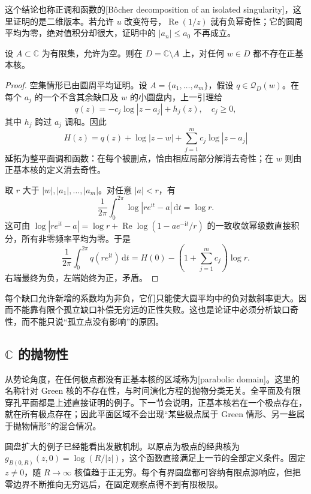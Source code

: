 这个结论也称正调和函数的[Bôcher decomposition of an isolated singularity]，这里证明的是二维版本。若允许 \(u\) 改变符号，\(\operatorname{Re}(1/z)\) 就有负幂奇性；它的圆周平均为零，绝对值积分却很大，证明中的 \(|a_n|\le a_0\) 不再成立。

\begin{proposition}\label{b3:prop:17-finite-punctures-parabolic}
设 \(A\subset\mathbb C\) 为有限集，允许为空。则在 \(D=\mathbb C\setminus A\) 上，对任何 \(w\in D\) 都不存在正基本核。
\end{proposition}
\begin{proof}
空集情形已由圆周平均证明。设 \(A=\{a_1,\ldots,a_m\}\)，假设 \(q\in\mathcal Q_D(w)\)。在每个 \(a_j\) 的一个不含其余缺口及 \(w\) 的小圆盘内，上一引理给
\[
 q(z)=-c_j\log|z-a_j|+h_j(z),\quad c_j\ge0,
\]
其中 \(h_j\) 跨过 \(a_j\) 调和。因此
\[
 H(z)=q(z)+\log|z-w|+\sum_{j=1}^m c_j\log|z-a_j|
\]
延拓为整平面调和函数：在每个被删点，恰由相应局部分解消去奇性；在 \(w\) 则由正基本核的定义消去奇性。

取 \(r\) 大于 \(|w|,|a_1|,\ldots,|a_m|\)。对任意 \(|a|<r\)，有
\[
 \frac1{2\pi}\int_0^{2\pi}\log|re^{\mathrm it}-a|\,\mathrm dt=\log r.
\]
这可由 \(\log|re^{\mathrm it}-a|=\log r+\operatorname{Re}\log(1-ae^{-\mathrm it}/r)\) 的一致收敛幂级数直接积分，所有非零频率平均为零。于是
\[
 \frac1{2\pi}\int_0^{2\pi}q(re^{\mathrm it})\,\mathrm dt
 =H(0)-\left(1+\sum_{j=1}^m c_j\right)\log r.
\]
右端最终为负，左端始终为正，矛盾。
\end{proof}

每个缺口允许新增的系数均为非负，它们只能使大圆平均中的负对数斜率更大。因而不能靠有限个孤立缺口补偿无穷远的正性失败。这也是论证中必须分析缺口奇性，而不能只说“孤立点没有影响”的原因。

\subsection{\texorpdfstring{\(\mathbb C\)}{C} 的抛物性}
\label{b3:subsec:170203}

从势论角度，在任何极点都没有正基本核的区域称为[parabolic domain]。这里的名称针对 Green 核的不存在性，与时间演化方程的抛物分类无关。全平面及有限穿孔平面都是上述直接证明的例子。下一节会说明，正基本核若在一个极点存在，就在所有极点存在；因此平面区域不会出现“某些极点属于 Green 情形、另一些属于抛物情形”的混合情况。

\ProseParagraphBreak
圆盘扩大的例子已经能看出发散机制。以原点为极点的经典核为 \(g_{B(0,R)}(z,0)=\log(R/|z|)\)，这个函数直接满足上一节的全部定义条件。固定 \(z\ne0\)，随 \(R\to\infty\) 核值趋于正无穷。每个有界圆盘都可容纳有限点源响应，但把零边界不断推向无穷远后，在固定观察点得不到有限极限。

